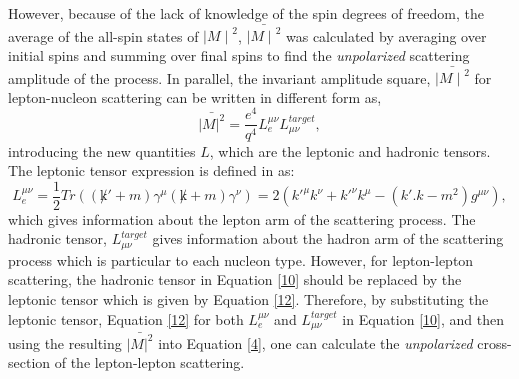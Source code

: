 However, because of the lack of knowledge of the spin degrees of freedom, the average of the all-spin states of ${\mid M \mid}^2$, ${\bar { {\mid M \mid}^2}}$ was calculated by averaging over initial spins and summing over final spins to find the \emph{unpolarized} scattering amplitude of the process.  In parallel, the invariant amplitude square, ${\bar { {\mid M \mid}^2}}$ for lepton-nucleon scattering can be written in different form as,
\begin{equation}
\label{10}
\bar{{|M|}^2}=\frac{e^4}{q^4} L_e^{\mu \nu} L_{\mu \nu}^{target},
\end {equation}
introducing the new quantities $L$, which are the leptonic and hadronic tensors. The leptonic tensor expression is defined in \cite{5} as:
\begin{equation}
\label{12}
L_e^{\mu \nu} = \frac{1}{2}Tr((\not k'+m)\gamma^ \mu(\not k+m)\gamma^\nu)=2(k'^\mu k^\nu+k'^\nu k^\mu-(k'.k-m^2)g^{\mu \nu}),
\end{equation}
which gives information about the lepton arm of the scattering process. The hadronic tensor, $L_{\mu \nu}^{target}$ gives information about the hadron arm of the scattering process which is particular to each nucleon type. However, for lepton-lepton scattering, the hadronic tensor in Equation \eqref{10} should be replaced by the leptonic tensor which is given by Equation \eqref{12}. Therefore, by substituting the leptonic tensor, Equation \eqref{12} for both $L_e^{\mu \nu}$ and $L_{\mu \nu}^{target}$ in Equation \eqref{10}, and then using the resulting $\bar{{|M|}^2}$ into Equation \eqref{4}, one can calculate the \emph{unpolarized} cross-section of the lepton-lepton scattering.

